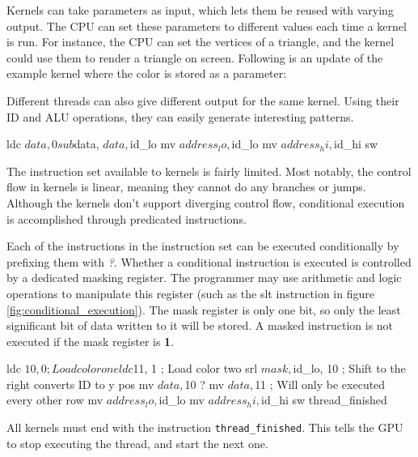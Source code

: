 \documentclass[../main/report.tex]{subfiles}
\begin{document}
Kernels can take parameters as input, which lets them be reused with varying output.
The CPU can set these parameters to different values each time a kernel is run.
For instance, the CPU can set the vertices of a triangle,
and the kernel could use them to render a triangle on screen.
Following is an update of the example kernel where the color is stored as a parameter:


Different threads can also give different output for the same kernel.
Using their ID and ALU operations, they can easily generate interesting patterns.

\begin{assembly}
ldc $data, 0
sub $data, $data, $id_lo
mv $address_lo, $id_lo
mv $address_hi, $id_hi
sw
\end{assembly}

The instruction set available to kernels is fairly limited.
Most notably, the control flow in kernels is linear, meaning they cannot do any branches or jumps.
Although the kernels don't support diverging control flow,
conditional execution is accomplished through predicated instructions.

Each of the instructions in the instruction set can be executed conditionally by prefixing them with \emph{?}.
Whether a conditional instruction is executed is controlled by a dedicated masking register.
The programmer may use arithmetic and logic operations to manipulate this register (such as the slt instruction in figure \ref{fig:conditional_execution}).
The mask register is only one bit, so only the least significant bit of data written to it will be stored.
A masked instruction is not executed if the mask register is \textbf{1}.

\begin{assembly}
ldc $10, 0 ; Load color one
ldc $11, 1 ; Load color two
srl $mask, $id_lo, 10 ; Shift to the right converts ID to y pos
mv $data, $10 
? mv $data, $11 ; Will only be executed every other row
mv $address_lo, $id_lo
mv $address_hi, $id_hi
sw
thread_finished
\end{assembly}

All kernels must end with the instruction \verb/thread_finished/.
This tells the GPU to stop executing the thread, and start the next one.

\end{document}
